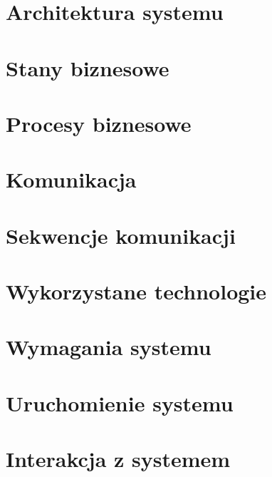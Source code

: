 \documentclass[../praca-dyplomowa.tex]{subfiles}
\begin{document}
\section{Architektura systemu}
\label{architecture}


%

\section{Stany biznesowe}


\section{Procesy biznesowe}


\section{Komunikacja}


\section{Sekwencje komunikacji}


\section{Wykorzystane technologie}


\section{Wymagania systemu}


\section{Uruchomienie systemu}


\section{Interakcja z systemem}

\end{document}
